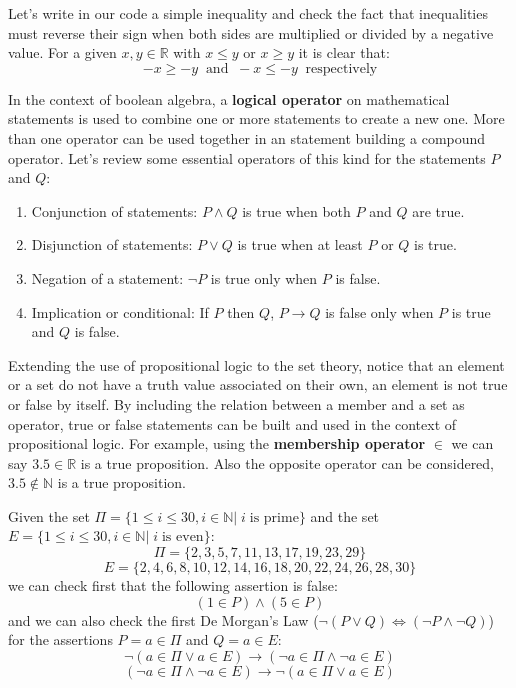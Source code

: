 Let's write in our code a simple inequality and check the fact that inequalities 
must reverse their sign when both sides are multiplied or divided by a negative value. 
For a given $x,y\in\mathbb{R}$ with $x\leq y$ or $x \geq y$ it is clear that:
$$
-x \geq -y \;\; \textrm{and} \;\; -x \leq -y \;\; \textrm{respectively}
$$

In the context of boolean algebra, a \textbf{logical operator} on mathematical statements is used to combine one or more statements to create a new one. 
More than one operator can be used together in an statement building a compound operator. 
Let's review some essential operators of this kind for the statements $P$ and $Q$:
\begin{enumerate}[noitemsep]
    \item Conjunction of statements: $P \land Q$ is true when both $P$ and $Q$ are true.
    \item Disjunction of statements: $P\lor Q$ is true when at least $P$ or $Q$ is true.
    \item Negation of a statement: $\neg P$ is true only when $P$ is false.
    \item Implication or conditional: If $P$ then $Q$, $P\to Q$ is false only when $P$ is true and $Q$ is false. 
\end{enumerate}

Extending the use of propositional logic to the set theory, notice that an element or a set 
do not have a truth value associated on their own, an element is not true or false by itself. 
By including the relation between a member and a set as operator, true or false statements can be 
built and used in the context of propositional logic. 
For example, using the \textbf{membership operator} $\in$ we can say $3.5 \in \mathbb{R}$ is a true proposition. 
Also the opposite operator can be considered, $3.5 \notin \mathbb{N}$ is a true proposition.

Given the set 
$\Pi = \{1\leq i\leq 30, i\in\mathbb{N}|\; i \;\textrm{is prime}\}$ 
and the set 
$E = \{1\leq i\leq 30, i\in\mathbb{N}|\; i \; \textrm{is even}\}$: 
$$
\Pi = \{2, 3, 5, 7, 11, 13, 17, 19, 23, 29\}
$$
$$
E = \{2, 4, 6, 8, 10, 12, 14, 16, 18, 20, 22, 24, 26, 28, 30\}
$$
we can check first that the following assertion is false:
$$
(1\in P) \land (5\in P)
$$
and we can also check the first De Morgan's Law ($\neg (P\lor Q) \iff (\neg P \land \neg Q)$) for the assertions $P = a\in \Pi$ and $Q = a\in E$:
$$
\neg (a\in\Pi \lor a\in E) \to (\neg a\in\Pi \land \neg a\in E)
$$
$$
(\neg a\in\Pi \land \neg a\in E) \to   \neg (a\in\Pi \lor a\in E)
$$


